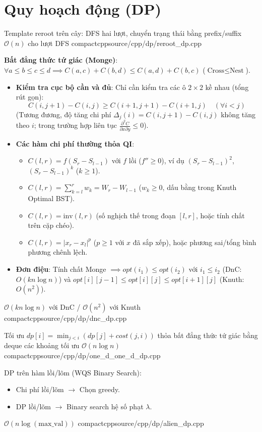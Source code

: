 \section{Quy hoạch động (DP)}

{Template reroot trên cây: DFS hai lượt, chuyển trạng thái bằng prefix/suffix}
{$\mathcal{O}(n)$ cho lượt DFS}
{compactcpp}{source/cpp/dp/reroot_dp.cpp}

{\textbf{Bất đẳng thức tứ giác (Monge)}: $\forall a \le b \le c \le d \implies C(a, c) + C(b, d) \le C(a, d) + C(b, c)$ ($\text{Cross} \le \text{Nest}$).
\begin{itemize}
  \item \textbf{Kiểm tra cục bộ cần và đủ}: Chỉ cần kiểm tra các ô $2 \times 2$ kề nhau (tổng rút gọn):
  $$ C(i, j+1) - C(i, j) \ge C(i+1, j+1) - C(i+1, j) \quad (\forall i < j) $$
  (Tương đương, độ tăng chi phí $\Delta_j(i) = C(i, j+1) - C(i, j)$ không tăng theo $i$; trong trường hợp liên tục $\frac{\partial^2 C}{\partial x \partial y} \le 0$).
  \item \textbf{Các hàm chi phí thường thỏa QI}:
  \begin{itemize}
    \item $C(l, r) = f(S_r - S_{l-1})$ với $f$ lồi ($f'' \ge 0$), ví dụ $(S_r - S_{l-1})^2$, $(S_r - S_{l-1})^k$ ($k \ge 1$).
    \item $C(l, r) = \sum_{k=l}^r w_k = W_r - W_{l-1}$ ($w_k \ge 0$, dấu bằng trong Knuth Optimal BST).
    \item $C(l, r) = \text{inv}(l, r)$ (số nghịch thế trong đoạn $[l, r]$, hoặc tính chất trên cặp chéo).
    \item $C(l, r) = |x_r - x_l|^p$ ($p \ge 1$ với $x$ đã sắp xếp), hoặc phương sai/tổng bình phương chênh lệch.
  \end{itemize}
  \item \textbf{Đơn điệu}: Tính chất Monge $\implies opt(i_1) \le opt(i_2)$ với $i_1 \le i_2$ (DnC: $O(k n \log n)$) và $opt[i][j-1] \le opt[i][j] \le opt[i+1][j]$ (Knuth: $O(n^2)$).
\end{itemize}
}
{$\mathcal{O}(k n \log n)$ với DnC / $\mathcal{O}(n^2)$ với Knuth}
{compactcpp}{source/cpp/dp/dnc_dp.cpp}

{Tối ưu $dp[i] = \min_{j < i} (dp[j] + cost(j, i))$ thỏa bất đẳng thức tứ giác bằng deque các khoảng tối ưu}
{$\mathcal{O}(n \log n)$}
{compactcpp}{source/cpp/dp/one_d_one_d_dp.cpp}

{DP trên hàm lồi/lõm (WQS Binary Search):
\begin{itemize}
  \item Chi phí lồi/lõm $\to$ Chọn greedy.
  \item DP lồi/lõm $\to$ Binary search hệ số phạt $\lambda$.
\end{itemize}
}
{$\mathcal{O}(n \log (\text{max\_val}))$}
{compactcpp}{source/cpp/dp/alien_dp.cpp}

